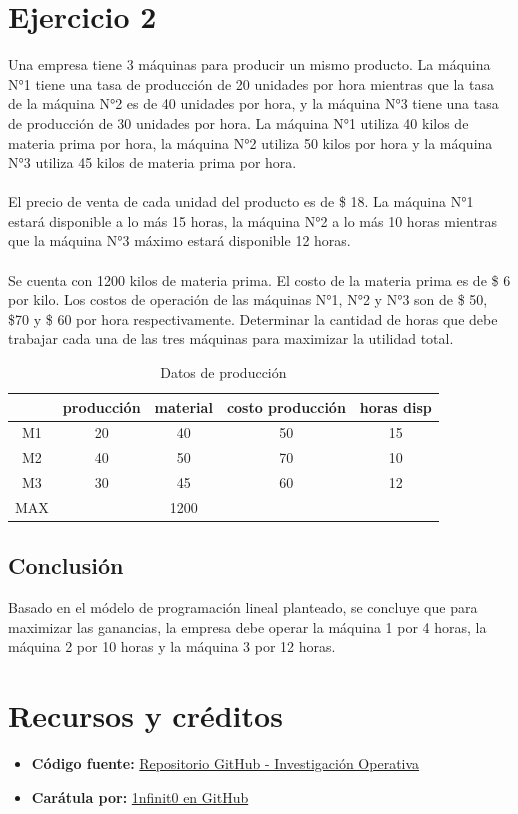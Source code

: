 \documentclass[12pt]{article}
\begin{document}
\newpage
\section*{Ejercicio 2}
\noindent Una empresa tiene 3 máquinas para producir un mismo producto. La máquina N°1 tiene una tasa de producción de 20 unidades por hora mientras que la tasa de la máquina N°2 es de 40 unidades por hora, y la máquina N°3 tiene una tasa de producción de 30 unidades por hora. La máquina N°1 utiliza 40 kilos de materia prima por hora, la máquina N°2 utiliza 50 kilos por hora y la máquina N°3 utiliza 45 kilos de materia prima por hora. \\\\
El precio de venta de cada unidad del producto es de \$ 18. La máquina N°1 estará disponible a lo más 15 horas, la máquina N°2 a lo más 10 horas mientras que la máquina N°3 máximo estará disponible 12 horas. \\\\
Se cuenta con 1200 kilos de materia prima. El costo de la materia prima es de \$ 6 por kilo. Los costos de operación de las máquinas N°1, N°2 y N°3 son de \$ 50, \$70 y \$ 60 por hora respectivamente. Determinar la cantidad de horas que debe trabajar cada una de las tres máquinas para maximizar la utilidad total.

\vspace{0.5cm}

\begin{table}[!htbp]
  \centering
  \begin{tabular}{c c c c c}
    \toprule
       & \textbf{producción} & \textbf{material} & \textbf{costo producción} & \textbf{horas disp}\\
    \midrule
    M1 & 20 & 40 & 50 & 15 \\
    M2 & 40 & 50 & 70 & 10 \\
    M3 & 30 & 45 & 60 & 12 \\
    \midrule
    MAX & & 1200 & & \\
    \bottomrule
  \end{tabular}
  \caption{Datos de producción}
  \label{tab:ejercicio2}
\end{table}

\subsection*{Conclusión}
\noindent Basado en el módelo de programación lineal planteado, se concluye que para maximizar las ganancias, la empresa debe operar la máquina 1 por 4 horas, la máquina 2 por 10 horas y la máquina 3 por 12 horas.

\newpage
\section*{Recursos y créditos}

\begin{itemize}
    \item \textbf{Código fuente:} \href{https://github.com/MateoTVara/C08-InvestigacionOperativa}{Repositorio GitHub - Investigación Operativa}
    \item \textbf{Carátula por:} \href{https://github.com/1nfinit0}{1nfinit0 en GitHub}
\end{itemize}
\end{document}
